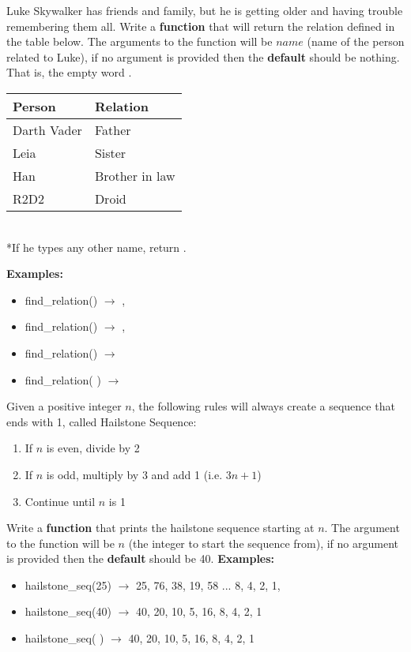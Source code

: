 	\item 
		Luke Skywalker has friends and family, but he is getting older and having trouble 
		remembering them all.  Write a \textbf{function} that will return the relation 
		defined in the table below. The arguments to the function will be $name$ 
		(name of the person related to Luke), if no argument is provided then the 
		\textbf{default} should be nothing. That is, the empty word \csq{ }. \\ 
		\begin{center}
		\begin{tabular}{|l|l|} \hline
			Person 		& Relation \\ \hline \hline
			Darth Vader	& Father \\ \hline
			Leia		& Sister \\ \hline
			Han			& Brother in law\\ \hline
			R2D2		& Droid \\ \hline
		\end{tabular}\\ \hspace*{1in} *If he types any other name, return .
		\end{center}
		\textbf{Examples:}		
		\begin{itemize}
			\item  find\_relation() $\rightarrow$ , 
			\item  find\_relation() $\rightarrow$ , 
			\item  find\_relation() $\rightarrow$ 
			\item  find\_relation( ) $\rightarrow$ 
		\end{itemize}


	\item 
		Given a positive integer $n$, the following rules will always create a sequence that 
		ends with 1, called Hailstone Sequence:
		\begin{enumerate}
			\item If $n$ is even, divide by 2
			\item If $n$ is odd, multiply by 3 and add 1 (i.e. $3n+1$)
			\item Continue until $n$ is 1
		\end{enumerate}
		Write a \textbf{function} that prints the hailstone sequence starting at $n$. 
		The argument to the function will be $n$ (the integer to start the sequence from), 
		if no argument is provided then the \textbf{default} should be 40.
		\textbf{Examples:}		
		\begin{itemize}
			\item  hailstone\_seq(25) $\rightarrow$ 25, 76, 38, 19, 58 ... 8, 4, 2, 1, 
			\item  hailstone\_seq(40) $\rightarrow$ 40, 20, 10, 5, 16, 8, 4, 2, 1
			\item  hailstone\_seq( ) $\rightarrow$ 40, 20, 10, 5, 16, 8, 4, 2, 1
		\end{itemize}


